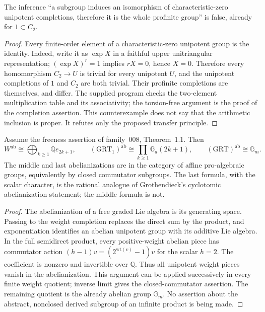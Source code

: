 The inference ``a subgroup induces an isomorphism of characteristic-zero
unipotent completions, therefore it is the whole profinite group'' is
false, already for $1\subset C_2$.
\begin{proof}
Every finite-order element of a characteristic-zero unipotent group is
the identity.  Indeed, write it as $\exp X$ in a faithful upper
unitriangular representation; $(\exp X)^r=1$ implies $rX=0$, hence
$X=0$.  Therefore every homomorphism $C_2\to U$ is trivial for every
unipotent $U$, and the unipotent completions of $1$ and $C_2$ are both
trivial.  Their profinite completions are themselves, and differ.
The supplied program checks the two-element multiplication table and
its associativity; the torsion-free argument is the proof of the
completion assertion.  This counterexample does not say that the
arithmetic inclusion is proper.  It refutes only the proposed transfer
principle.
\end{proof}

Assume the freeness assertion of family~008, Theorem~1.1.  Then
\[
 W^{\mathrm{ab}}\cong\bigoplus_{k\geq1}\mathbb Q e_{2k+1},
 \qquad
 (\mathrm{GRT}_1)^{\mathrm{ab}}
       \cong\prod_{k\geq1}\mathbb G_a(2k+1),
 \qquad
 (\mathrm{GRT})^{\mathrm{ab}}\cong\mathbb G_m.
\]
The middle and last abelianizations are in the category of affine
pro-algebraic groups, equivalently by closed commutator subgroups.
The last formula, with the scalar character, is the rational analogue
of Grothendieck's cyclotomic abelianization statement; the middle
formula is not.
\begin{proof}
The abelianization of a free graded Lie algebra is its generating
space.  Passing to the weight completion replaces the direct sum by
the product, and exponentiation identifies an abelian unipotent group
with its additive Lie algebra.  In the full semidirect product, every
positive-weight abelian piece has commutator action
$(h-1)v=(2^{\mathrm{wt}(v)}-1)v$ for the scalar $h=2$.
The coefficient is nonzero and invertible over $\mathbb Q$.
Thus all unipotent weight pieces vanish in the abelianization.
This argument can be applied successively in every finite weight
quotient; inverse limit gives the closed-commutator assertion.  The
remaining quotient is the already abelian group $\mathbb G_m$.
No assertion about the abstract, nonclosed derived subgroup of an
infinite product is being made.
\end{proof}

